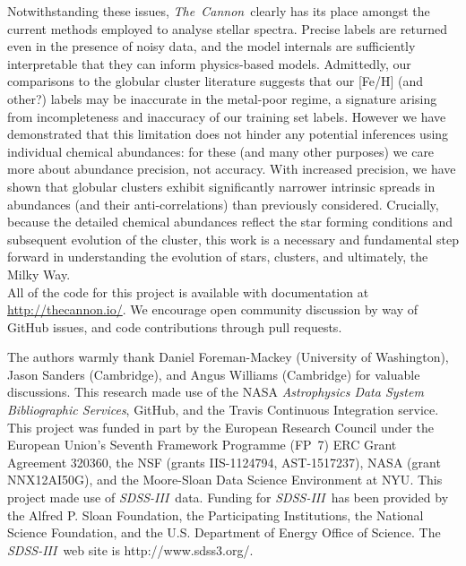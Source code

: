 \documentclass[12pt,preprint]{aastex6}
\newcommand{\project}[1]{\textsl{#1}}
\newcommand{\TheCannon}{\project{The~Cannon}}
\newcommand{\acronym}[1]{{\small{#1}}}
\newcommand{\sdssiii}{\project{\acronym{SDSS-III}}}
\begin{document}
Notwithstanding these issues, \TheCannon\ clearly has its place amongst
the current methods employed to analyse stellar spectra.  Precise labels
are returned even in the presence of noisy data, and the model internals
are sufficiently interpretable that they can inform physics-based models.
Admittedly, our comparisons to the globular cluster literature suggests
that our [Fe/H] (and other?) labels may be inaccurate in the metal-poor
regime, a signature arising from incompleteness and inaccuracy of our
training set labels.  However we have demonstrated that this limitation does not 
hinder any potential inferences using individual chemical abundances:
for these (and many other purposes) we care more about abundance precision,
not accuracy. With increased precision, we have shown that globular clusters
exhibit significantly narrower intrinsic spreads in abundances (and their anti-correlations)
than previously considered.  Crucially, because the detailed chemical
abundances reflect the star forming conditions and subsequent evolution of
the cluster, this work is a necessary and fundamental step forward in
understanding the evolution of stars, clusters, and ultimately, the Milky Way.\\


All of the code for this project is available with documentation at \url{http://thecannon.io/}.  
We encourage open community discussion by way of GitHub issues, and code contributions through pull requests.


\acknowledgements
The authors warmly thank Daniel Foreman-Mackey (University of Washington),
						 Jason Sanders (Cambridge), and
						 Angus Williams (Cambridge) for valuable discussions.
This research made use of
  the \acronym{NASA} \project{Astrophysics Data System Bibliographic Services},
  GitHub, and the Travis Continuous Integration service.
This project was funded in part by
  the European Research Council under the European Union's Seventh Framework 
  Programme (FP~7) \acronym{ERC} Grant Agreement 320360,
  the \acronym{NSF} (grants \acronym{IIS-1124794}, \acronym{AST-1517237}),
  \acronym{NASA} (grant \acronym{NNX12AI50G}), and 
  the Moore-Sloan Data Science Environment at \acronym{NYU}.
This project made use of \sdssiii\ data.
Funding for \sdssiii\ has been provided by the Alfred P. Sloan
Foundation, the Participating Institutions, the National Science
Foundation, and the \acronym{U.S.} Department of Energy Office of Science. The
\sdssiii\ web site is http://www.sdss3.org/.
\end{document}
